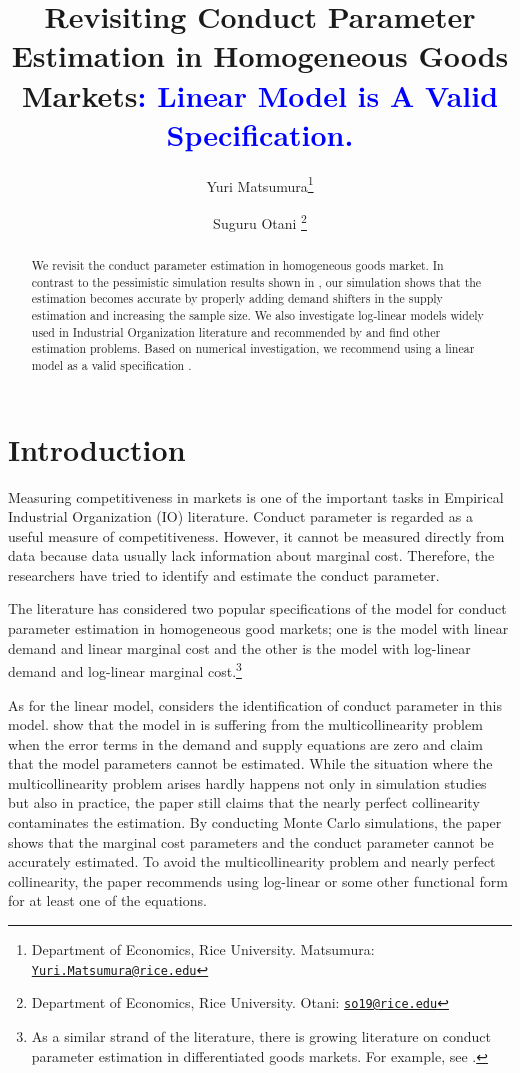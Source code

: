 \documentclass[11pt, a4paper]{article}
\title{Revisiting Conduct
Parameter Estimation in Homogeneous Goods Markets\textcolor{blue}{: Linear Model is A Valid Specification.}}
\author{Yuri Matsumura\footnote{Department of Economics, Rice University. Matsumura: \texttt{\href{mailto:Yuri.Matsumura@rice.edu}{Yuri.Matsumura@rice.edu}}} \and Suguru Otani \footnote{Department of Economics, Rice University. Otani: \texttt{\href{mailto:so19@rice.edu}{so19@rice.edu}}}}
\begin{document}
\maketitle

\begin{abstract}
    We revisit the conduct parameter estimation in homogeneous goods market. In contrast to the pessimistic simulation results shown in \cite{perloff2012collinearity}, our simulation shows that the estimation becomes accurate by properly adding demand shifters in the supply estimation and increasing the sample size. We also investigate log-linear models widely used in Industrial Organization literature and recommended by \cite{perloff2012collinearity} and find other estimation problems. Based on numerical investigation, we recommend using a linear model as a valid specification . %
\end{abstract}

\section{Introduction}
Measuring competitiveness in markets is one of the important tasks in Empirical Industrial Organization (IO) literature.
Conduct parameter is regarded as a useful measure of competitiveness. 
However, it cannot be measured directly from data because data usually lack information about marginal cost.
Therefore, the researchers have tried to identify and estimate the conduct parameter.

The literature has considered two popular specifications of the model for conduct parameter estimation in homogeneous good markets; one is the model with linear demand and linear marginal cost and the other is the model with log-linear demand and log-linear marginal cost.\footnote{As a similar strand of the literature, there is growing literature on conduct parameter estimation in differentiated goods markets. For example, see \cite{gandhi2021empirical}.}

As for the linear model, \citet{bresnahan1982oligopoly} considers the identification of conduct parameter in this model. 
\citet{perloff2012collinearity} show that the model in \citet{bresnahan1982oligopoly} is suffering from the multicollinearity problem when the error terms in the demand and supply equations are zero and claim that the model parameters cannot be estimated.
While the situation where the multicollinearity problem arises hardly happens not only in simulation studies but also in practice, the paper still claims that the nearly perfect collinearity contaminates the estimation.
By conducting Monte Carlo simulations, the paper shows that the marginal cost parameters and the conduct parameter cannot be accurately estimated.
To avoid the multicollinearity problem and nearly perfect collinearity, the paper recommends using log-linear or some other functional form for at least one of the equations.
\end{document}
